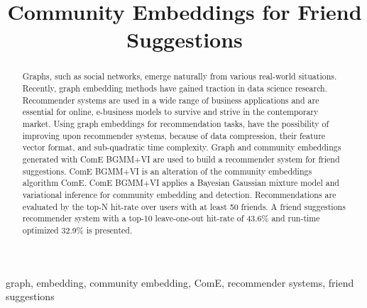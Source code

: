 \documentclass[conference]{IEEEtran}
\begin{document}
\title{Community Embeddings for Friend Suggestions}

\author{
    \and
}

\maketitle

\begin{abstract}
    Graphs, such as social networks, emerge naturally from various real-world situations. Recently, graph embedding methods have gained traction in data science research.
    Recommender systems are used in a wide range of business applications and are essential for online, e-business models to survive and strive in the contemporary market. Using graph embeddings for recommendation tasks, have the possibility of improving upon recommender systems, because of data compression, their feature vector format, and sub-quadratic time complexity.
    Graph and community embeddings generated with ComE BGMM+VI are used to build a recommender system for friend suggestions. ComE BGMM+VI is an alteration of the community embeddings algorithm ComE. ComE BGMM+VI applies a Bayesian Gaussian mixture model and variational inference for community embedding and detection.
    Recommendations are evaluated by the top-N hit-rate over users with at least 50 friends. A friend suggestions recommender system with a top-10 leave-one-out hit-rate of 43.6\% and run-time optimized 32.9\% is presented.
\end{abstract}

\begin{IEEEkeywords}
    graph, embedding, community embedding, ComE, recommender systems, friend suggestions
\end{IEEEkeywords}
\end{document}
